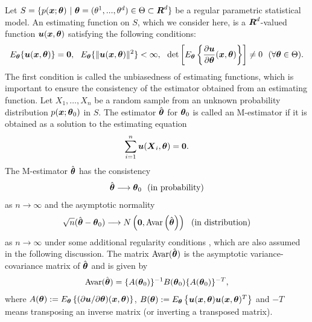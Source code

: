 \documentclass[graybox]{svmult}
\newcommand{\bm}[1]{\mbox{\boldmath $#1$}}
\newcommand{\bms}[1]{\mbox{\scriptsize\boldmath $#1$}}
\begin{document}
Let $S=\{p(\bm{x};\bm{\theta}) \ | \ \bm{\theta}=(\theta^1,...,\theta^d) \in \Theta \subset
\bm{R}^d\}$ be a regular parametric statistical model.
An estimating function on $S$, which we consider here, is a $\bm{R}^{d}$-valued function
$\bm{u}(\bm{x},\bm{\theta})$ satisfying the following conditions:
%
\begin{eqnarray*}
   E_{\bms{\theta}}\{\bm{u}(\bm{x},\bm{\theta})\} = \bm{0}, \ \
   E_{\bms{\theta}}\{\|\bm{u}(\bm{x},\bm{\theta})\|^2\} < \infty, \ \
   \det\left[E_{\bms{\theta}}\left\{\frac{\partial\bm{u}}{\partial\bm{\theta}}
   (\bm{x},\bm{\theta})\right\}\right] \neq 0 \ \
   (\forall\bm{\theta} \in \Theta).
\end{eqnarray*}
%
The first condition is called the unbiasedness of estimating functions, which is important
to ensure the consistency of the estimator obtained from an estimating function.
Let $X_1,\ldots,X_n$ be a random sample from an unknown probability distribution
$p(\bm{x};\bm{\theta}_0)$ in $S$. The estimator $\hat{\bm{\theta}}$ for $\bm{\theta}_0$
is called an M-estimator if it is obtained as a solution to the estimating equation
%
\begin{eqnarray}\label{esteq}
   \sum_{i=1}^{n}\bm{u}(\bm{X}_i,\bm{\theta}) = \bm{0}.
\end{eqnarray}
%
The M-estimator $\hat{\bm{\theta}}$ has the consistency
%
\begin{eqnarray*}
   \hat{\bm{\theta}} \longrightarrow \bm{\theta}_0 \ \ (\mbox{in probability})
\end{eqnarray*}
%
as $n \rightarrow \infty$ and the asymptotic normality
%
\begin{eqnarray*}
   \sqrt{n}(\hat{\bm{\theta}} - \bm{\theta}_0) \longrightarrow
   N\left(\bm{0},{\rm Avar}\left(\hat{\bm{\theta}}\right)\right) \ \ (\mbox{in distribution})
\end{eqnarray*}
%
as $n \rightarrow \infty$ under some additional regularity conditions \cite{V}, which
are also assumed in the following discussion. 
The matrix ${\rm Avar}(\hat{\bm{\theta}})$ is the asymptotic variance-covariance matrix of
$\hat{\bm{\theta}}$ and is given by
%
\begin{eqnarray}\label{avar}
   {\rm Avar}(\hat{\bm{\theta}}) = \{A(\bm{\theta}_0)\}^{-1}B(\bm{\theta}_0)
                                   \{A(\bm{\theta}_0)\}^{-T} \label{avar},
\end{eqnarray}
%
where $A(\bm{\theta}):=E_{\bms{\theta}}\left\{(\partial\bm{u}/\partial\bm{\theta})(\bm{x},\bm{\theta})\right\}$,
$B(\bm{\theta}):=E_{\bms{\theta}}\left\{\bm{u}(\bm{x},\bm{\theta})\bm{u}(\bm{x},\bm{\theta})^T\right\}$
and $-T$ means transposing an inverse matrix (or inverting a transposed matrix).
\end{document}
